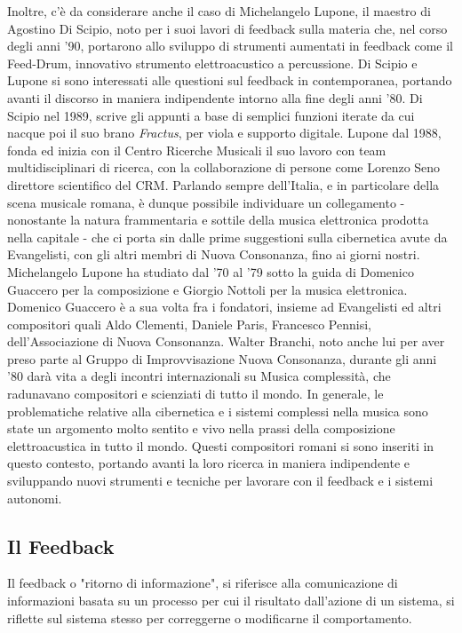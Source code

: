 Inoltre, c'è da considerare anche il caso di Michelangelo Lupone, 
il maestro di Agostino Di Scipio, noto per i suoi lavori di feedback sulla materia che, 
nel corso degli anni '90, portarono allo sviluppo di strumenti aumentati in feedback come il Feed-Drum, 
innovativo strumento elettroacustico a percussione.
Di Scipio e Lupone si sono interessati alle questioni sul feedback in contemporanea, 
portando avanti il discorso in maniera indipendente intorno alla fine degli anni '80. 
Di Scipio nel 1989, scrive gli appunti a base di semplici funzioni
iterate da cui nacque poi il suo brano 
\textit{Fractus}, per viola e supporto digitale.
Lupone dal 1988, fonda ed inizia con il Centro Ricerche Musicali il suo lavoro
con team multidisciplinari di ricerca,
con la collaborazione di persone come Lorenzo Seno direttore scientifico del CRM.
Parlando sempre dell'Italia, e in particolare della scena musicale romana, 
è dunque possibile individuare un collegamento -
nonostante la natura frammentaria e sottile della musica elettronica prodotta nella capitale -
che ci porta sin dalle prime suggestioni sulla cibernetica avute da Evangelisti, 
con gli altri membri di Nuova Consonanza, fino ai giorni nostri. 
Michelangelo Lupone ha studiato dal '70 al '79 sotto la guida di Domenico Guaccero 
per la composizione e Giorgio Nottoli per la musica elettronica. 
Domenico Guaccero è a sua volta fra i fondatori, insieme ad Evangelisti
ed altri compositori
quali Aldo Clementi, Daniele Paris, Francesco Pennisi,
dell'Associazione di Nuova Consonanza.
Walter Branchi, noto anche lui
per aver preso parte al Gruppo di Improvvisazione Nuova Consonanza,
durante gli anni '80 darà vita a degli incontri internazionali su
Musica complessità, che radunavano compositori e scienziati di
tutto il mondo.
In generale, le problematiche relative alla cibernetica e i sistemi complessi nella musica
sono state un argomento molto sentito e vivo nella prassi della composizione elettroacustica in tutto il mondo. 
Questi compositori romani si sono inseriti in questo contesto, 
portando avanti la loro ricerca in maniera indipendente e sviluppando nuovi strumenti e 
tecniche per lavorare con il feedback e i sistemi autonomi.

\clearpage

\subsection{Il Feedback}
\label{sec:Il Feedback}
Il feedback o "ritorno di informazione", 
si riferisce alla comunicazione di informazioni basata su un processo per cui il 
risultato dall'azione di un sistema, 
si riflette sul sistema stesso per correggerne o modificarne il comportamento.

